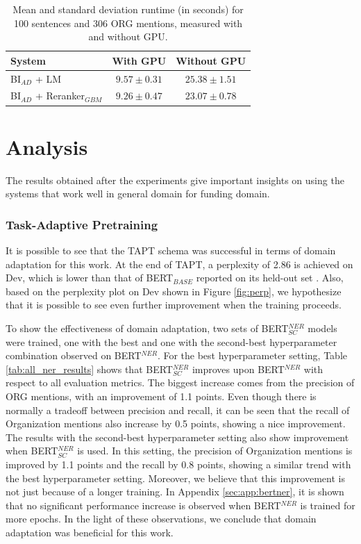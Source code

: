 \documentclass{report}
\theoremstyle{definition}
\theoremstyle{remark}
\begin{document}
\begin{table}[H]
    \centering
    \begin{tabular}{l|cc}
    System   & With GPU & Without GPU  \\
    \hline
    BI$_{AD}$ + LM & $9.57 \pm 0.31$ &$25.38 \pm 1.51$\\
    BI$_{AD}$ + Reranker$_{GBM}$ & $9.26 \pm 0.47$ &$23.07 \pm 0.78$\\
    \end{tabular}
    \caption{Mean and standard deviation runtime (in seconds) for 100 sentences and 306 ORG mentions, measured with and without GPU.}
    \label{tab:lmvsgbm2}
\end{table}


\section{Analysis}
\label{sec:EvalAnalysis}

The results obtained after the experiments give important insights on using the systems that work well in general domain for funding domain. 

\subsubsection{Task-Adaptive Pretraining}

It is possible to see that the TAPT schema was successful in terms of domain adaptation for this work. At the end of TAPT, a perplexity of 2.86 is achieved on Dev, which is lower than that of BERT$_{BASE}$ reported on its held-out set \cite{BERT}. Also, based on the perplexity plot on Dev shown in Figure \ref{fig:perp}, we hypothesize that it is possible to see even further improvement when the training proceeds.

To show the effectiveness of domain adaptation, two sets of BERT$^{NER}_{SC}$ models were trained, one with the best and one with the second-best hyperparameter combination observed on BERT$^{NER}$. For the best hyperparameter setting, Table \ref{tab:all_ner_results} shows that BERT$^{NER}_{SC}$ improves upon BERT$^{NER}$ with respect to all evaluation metrics. The biggest increase comes from the precision of ORG mentions, with an improvement of 1.1 points. Even though there is normally a tradeoff between precision and recall, it can be seen that the recall of Organization mentions also increase by 0.5 points, showing a nice improvement. The results with the second-best hyperparameter setting also show improvement when BERT$^{NER}_{SC}$ is used. In this setting, the precision of Organization mentions is improved by 1.1 points and the recall by 0.8 points, showing a similar trend with the best hyperparameter setting. Moreover, we believe that this improvement is not just because of a longer training. In Appendix \ref{sec:app:bertner}, it is shown that no significant performance increase is observed when BERT$^{NER}$ is trained for more epochs. In the light of these observations, we conclude that domain adaptation was beneficial for this work. 
\end{document}
